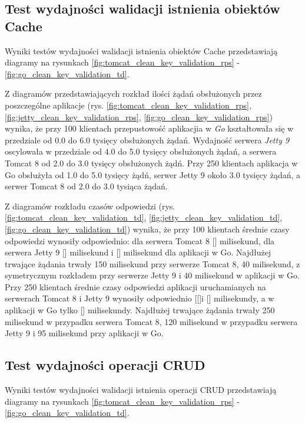 % 
\clearpage

\subsection{Test wydajności walidacji istnienia obiektów Cache}
Wyniki testów wydajności walidacji istnienia obiektów Cache przedstawiają diagramy na rysunkach \ref{fig:tomcat_clean_key_validation_rps} - \ref{fig:go_clean_key_validation_td}.              

Z diagramów przedstawiających rozkład ilości żądań obsłużonych przez poszczególne aplikacje  (rys. \ref{fig:tomcat_clean_key_validation_rps}, \ref{fig:jetty_clean_key_validation_rps}, \ref{fig:go_clean_key_validation_rps}) wynika, że przy 100 klientach przepustowość aplikacjia w \textsl{Go} kształtowała się w przedziale od 0.0 do 6.0 tysięcy obsłużonych żądań. Wydajność serwera \textsl{Jetty 9} oscylowała w przedziale od 4.0 do 5.0 tysięcy obsłużonych żądań, a  serwera Tomcat 8  od 2.0 do 3.0 tysięcy obsłużonych żądń.  Przy 250 klientach aplikacja w Go obsłużyła od 1.0 do 5.0 tysięcy żądń, serwer Jetty 9 około 3.0 tysięcy żądań, a serwer Tomcat 8 od 2.0 do 3.0 tysiąca żądań.

Z diagramów rozkładu czasów odpowiedzi (rys. \ref{fig:tomcat_clean_key_validation_td}, \ref{fig:jetty_clean_key_validation_td}, \ref{fig:go_clean_key_validation_td}) wynika, że przy 100 klientach średnie czasy odpowiedzi wynosiły odpowiednio: dla serwera Tomcat 8 [] milisekund, dla serwera Jetty 9 [] milisekund i [] milisekund dla aplikacji w Go.  Najdłużej trwające żądania trwały 150 milisekund przy serwerze Tomcat 8, 40 milisekund, z symetrycznym rozkładem przy serwerze  Jetty 9 i 40 milisekund  w aplikacji w Go. Przy 250 klientach średnie czasy odpowiedzi aplikacji uruchamianych na serwerach Tomcat 8 i Jetty 9  wynosiły odpowiednio [[]i [] milisekundy, a w aplikacji w Go tylko [] milisekundy. Najdłużej trwające żądania trwały 250 milisekund w przypadku serwera Tomcat 8, 120 milisekund w przypadku serwera Jetty 9 i 95 milisekund przy aplikacji w Go. 


\clearpage

\subsection{Test wydajności operacji CRUD}

Wyniki testów wydajności walidacji istnienia operacji CRUD przedstawiają diagramy na rysunkach \ref{fig:tomcat_clean_key_validation_rps} - \ref{fig:go_clean_key_validation_td}.              

